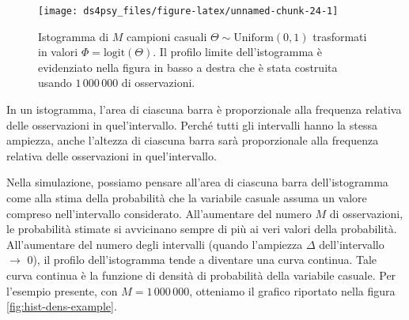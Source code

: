 \documentclass[
  11pt,
]{krantz}
\theoremstyle{definition}
\theoremstyle{definition}
\theoremstyle{definition}
\theoremstyle{definition}
\theoremstyle{remark}
\begin{document}
\begin{figure}

{\centering \texttt{[image: ds4psy\_files/figure-latex/unnamed-chunk-24-1]} 

}

\caption{Istogramma di $M$ campioni casuali $\Theta \sim \mbox{Uniform}(0, 1)$ trasformati in valori $\Phi = \mbox{logit}(\Theta).$ Il profilo limite dell'istogramma è evidenziato nella figura in basso a destra che è stata costruita usando $1\,000\,000$ di osservazioni.}\label{fig:unnamed-chunk-24}
\end{figure}

In un istogramma, l'area di ciascuna barra è proporzionale alla frequenza relativa delle osservazioni in quel'intervallo. Perché tutti gli intervalli hanno la stessa ampiezza, anche l'altezza di ciascuna barra sarà proporzionale alla frequenza relativa delle osservazioni in quel'intervallo.

Nella simulazione, possiamo pensare all'area di ciascuna barra dell'istogramma come alla stima della probabilità che la variabile casuale assuma un valore compreso nell'intervallo considerato. All'aumentare del numero \(M\) di osservazioni, le probabilità stimate si avvicinano sempre di più ai veri valori della probabilità. All'aumentare del numero degli intervalli (quando l'ampiezza \(\Delta\) dell'intervallo \(\rightarrow\) 0), il profilo dell'istogramma tende a diventare una curva continua. Tale curva continua è la funzione di densità di probabilità della variabile casuale. Per l'esempio presente, con \(M =1\,000\,000\), otteniamo il grafico riportato nella figura \ref{fig:hist-dens-example}.
\end{document}
